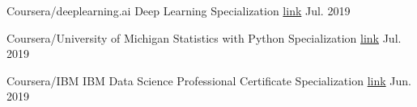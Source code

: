 


\begin{cvhonors}

  \cvhonor
    {Coursera/deeplearning.ai} %
    {Deep Learning Specialization} %
    {\href{https://www.coursera.org/account/accomplishments/specialization/LXGTFW8N6B9W}{link}} %
    {Jul. 2019} %

  \cvhonor
    {Coursera/University of Michigan} %
    {Statistics with Python Specialization} %
    {\href{https://www.coursera.org/account/accomplishments/specialization/W952YECLMS2T}{link}} %
    {Jul. 2019} %

  \cvhonor
    {Coursera/IBM} %
    {IBM Data Science Professional Certificate Specialization} %
    {\href{https://www.coursera.org/account/accomplishments/specialization/BH2XN4WKF7ZP}{link}} %
    {Jun. 2019} %

\end{cvhonors}
